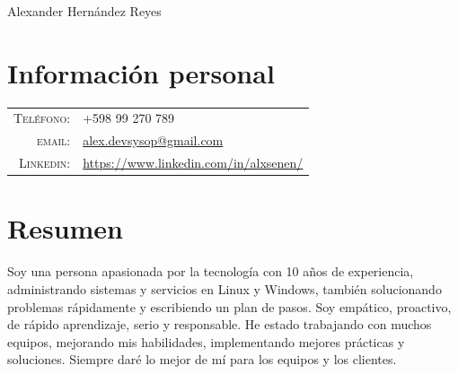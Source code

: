 \documentclass[a4paper,12pt]{article}
\begin{document}
\vspace*{-0.5cm}

\pagestyle{empty} %

{\huge Alexander Hern\'andez Reyes}
\hfill
{}\\
\section{Informaci\'on personal}
\begin{tabular}{rl}
    \textsc{Tel\'efono:}     & +598 99 270 789 \\
    \textsc{email:}     & \href{mailto:alex.devsysop@gmail.com}{alex.devsysop@gmail.com} \\
    \textsc{Linkedin:}     & \href{https://www.linkedin.com/in/alxsenen/}{https://www.linkedin.com/in/alxsenen/} \\

\end{tabular}
\section{Resumen}
\justify
Soy una persona apasionada por la tecnología con 10 años de experiencia, administrando sistemas y servicios en Linux y Windows, también solucionando problemas rápidamente y escribiendo un plan de pasos. Soy empático, proactivo, de rápido aprendizaje, serio y responsable.
He estado trabajando con muchos equipos, mejorando mis habilidades, implementando mejores prácticas y soluciones. Siempre daré lo mejor de mí para los equipos y los clientes.

\end{document}
